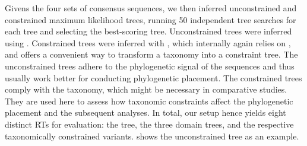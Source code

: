 Givens the four sets of consensus sequences,
we then inferred unconstrained and constrained maximum likelihood trees,
running 50 independent tree searches for each tree and selecting the best-scoring tree.
Unconstrained trees were inferred using  \citep{Stamatakis2014}.
Constrained trees were inferred with  \citep{Kozlov2016},
which internally again relies on ,
and offers a convenient way to transform a taxonomy into a constraint tree.
The unconstrained trees adhere to the phylogenetic signal of the sequences
and thus usually work better for conducting phylogenetic placement.
The constrained trees comply with the  taxonomy,
which might be necessary in comparative studies.
They are used here to assess how taxonomic constraints affect the phylogenetic placement and the subsequent analyses.
In total, our setup hence yields eight distinct \acp{RT} for evaluation:
the  tree, the three domain trees, and the respective taxonomically constrained variants.
 shows the unconstrained  tree as an example.

